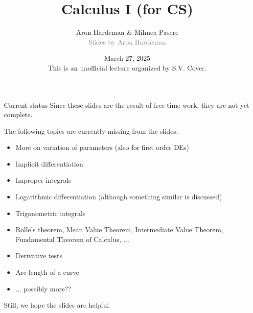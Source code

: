 \documentclass[
handout
]{beamer}
\title{Calculus I (for CS)}
\author[Mihnea Pasere \& Aron Hardeman]{\texorpdfstring{Aron Hardeman \& Mihnea Pasere\\\textcolor{gray}{Slides by Aron Hardeman}}{Aron Hardeman}}
\date[March 27, 2025]{March 27, 2025\\This is an unofficial lecture organized by S.V. Cover.}
\begin{document}
\maketitle

\begin{frame}{Current status}
    Since these slides are the result of free time work, they are not yet complete.

    The following topics are currently missing from the slides:
    \begin{itemize}
        \pause\item More on variation of parameters (also for first order DEs)
        \pause\item Implicit differentiation
        \pause\item Improper integrals
        \pause\item Logarithmic differentiation (although something similar is discussed)
        \pause\item Trigonometric integrals
        \pause\item Rolle's theorem, Mean Value Theorem, Intermediate Value Theorem, Fundamental Theorem of Calculus, ...
        \pause\item Derivative tests
        \pause\item Arc length of a curve
        \pause\item ... possibly more??
    \end{itemize}
    Still, we hope the slides are helpful.
\end{frame}






\end{document}

